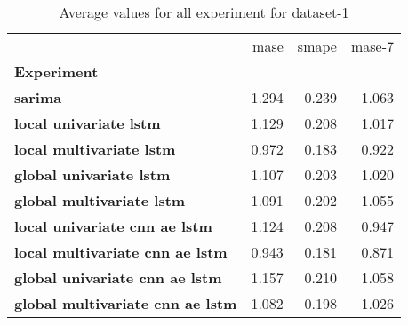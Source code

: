 \begin{table}[h]
\centering
\caption{Average values for all experiment for dataset-1}
\label{table:Average-metric-dataset-1}
\begin{tabular}{lrrr}
\toprule
{} &   mase &  smape &  mase-7 \\
\textbf{Experiment                     } &        &        &         \\
\midrule
\textbf{sarima                         } &  1.294 &  0.239 &   1.063 \\
\textbf{local univariate lstm          } &  1.129 &  0.208 &   1.017 \\
\textbf{local multivariate lstm        } &  0.972 &  0.183 &   0.922 \\
\textbf{global univariate lstm         } &  1.107 &  0.203 &   1.020 \\
\textbf{global multivariate lstm       } &  1.091 &  0.202 &   1.055 \\
\textbf{local univariate cnn ae lstm   } &  1.124 &  0.208 &   0.947 \\
\textbf{local multivariate cnn ae lstm } &  0.943 &  0.181 &   0.871 \\
\textbf{global univariate cnn ae lstm  } &  1.157 &  0.210 &   1.058 \\
\textbf{global multivariate cnn ae lstm} &  1.082 &  0.198 &   1.026 \\
\bottomrule
\end{tabular}
\end{table}
